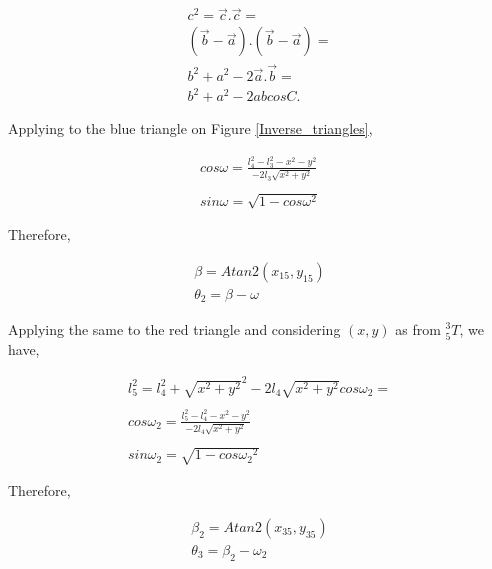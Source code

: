 \documentclass[transmag]{IEEEtran}
\begin{document}
\begin{equation}
\begin{matrix}
c^2 = \vec{c} . \vec{c} = \\
(\vec{b} - \vec{a}).(\vec{b} - \vec{a}) = \\
b^2 + a^2 - 2\vec{a} . \vec{b} = \\
b^2 + a^2 - 2 ab cosC.
\end{matrix}
\end{equation}

Applying to the blue triangle on Figure \ref{Inverse_triangles},

\begin{equation}
\begin{matrix}
cos\omega = \frac{l_4^2 - l_3^2 - x^2 - y^2}{-2l_3 \sqrt{x^2 + y^2}} \\
\\
sin \omega = \sqrt{1 - {cos \omega}^2}
\end{matrix}
\end{equation}


Therefore,

\begin{equation}
\begin{matrix}
\beta = Atan2(x_{15}, y_{15}) \\
\theta_2 = \beta - \omega
\end{matrix}
\end{equation}

Applying the same to the red triangle and considering $(x, y)$ as from $^3_5T$, we have,

\begin{equation}
\begin{matrix}
l_5^2 = l_4^2 + {\sqrt{x^2 + y^2}}^2 - 2 l_4 \sqrt{x^2 + y^2} cos \omega_2 =\\
\\
cos \omega_2 = \frac{l_5^2 - l_4^2 - x^2 - y^2}{-2l_4 \sqrt{x^2 + y^2}} \\
\\
sin \omega_2 = \sqrt{1 - {cos \omega_2}^2}

\end{matrix}
\end{equation}

Therefore,

\begin{equation}
\begin{matrix}
\beta_2 = Atan2(x_{35}, y_{35}) \\
\theta_3 = \beta_2 - \omega_2
\end{matrix}
\end{equation}
\end{document}
